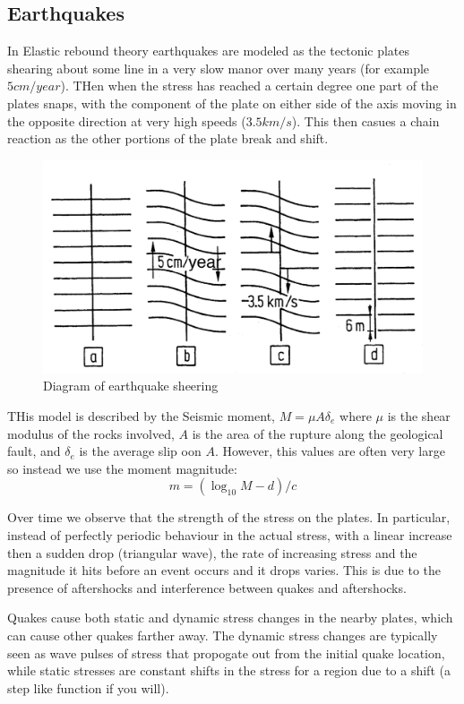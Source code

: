 \documentclass[12pt, a4paper, oneside, openright, titlepage]{book}
\begin{document}
\subsection{Earthquakes}

In Elastic rebound theory earthquakes are modeled as the tectonic plates shearing about some line in a very slow manor over many years (for example $5 cm/year$). THen when the stress has reached a certain degree one part of the plates snaps, with the component of the plate on either side of the axis moving in the opposite direction at very high speeds ($3.5 km/s$). This then casues a chain reaction as the other portions of the plate break and shift.
\begin{figure}[H]
    \centering
    \includegraphics[scale = 0.8]{Images/Earthquake.PNG}
    \caption{Diagram of earthquake sheering}
    \label{fig:quake}
\end{figure}

THis model is described by the Seismic moment, $M = \mu A \delta_e$ where $\mu$ is the shear modulus of the rocks involved, $A$ is the area of the rupture along the geological fault, and $\delta_e$ is the average slip oon $A$. However, this values are often very large so instead we use the moment magnitude: $$m = (\log_{10}M - d)/c$$

Over time we observe that the strength of the stress on the plates. In particular, instead of perfectly periodic behaviour in the actual stress, with a linear increase then a sudden drop (triangular wave), the rate of increasing stress and the magnitude it hits before an event occurs and it drops varies. This is due to the presence of aftershocks and interference between quakes and aftershocks.

Quakes cause both static and dynamic stress changes in the nearby plates, which can cause other quakes farther away. The dynamic stress changes are typically seen as wave pulses of stress that propogate out from the initial quake location, while static stresses are constant shifts in the stress for a region due to a shift (a step like function if you will).
\end{document}
